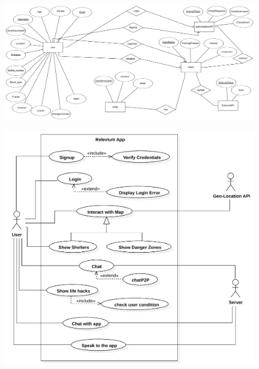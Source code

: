 \documentclass{scrreprt}
\begin{document}
\clearpage
\begin{figure}[ht!]
    \centering
    \includegraphics[angle=90, height=\textheight]{imgs/erd1.png}
    \label{fig:my_label}
\end{figure}


\clearpage

\begin{figure}[ht!]
    \centering
    \includegraphics[width=\textwidth]{img2/UseCaseDiagram1.pdf}
    \label{fig:my_label}
\end{figure}
\end{document}
